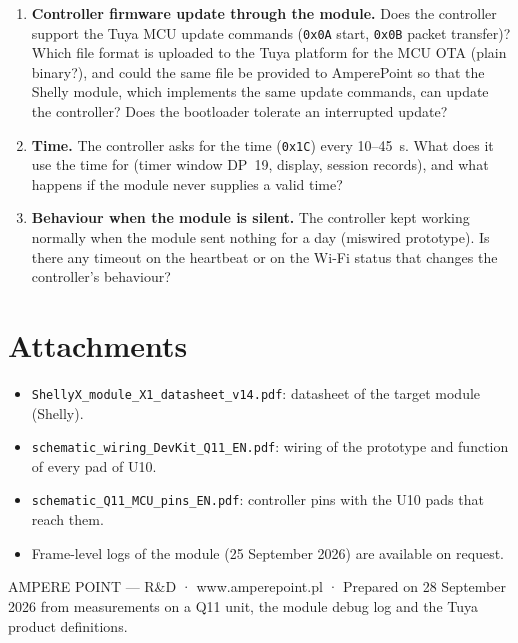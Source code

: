 \documentclass[11pt,a4paper]{article}
\newcommand{\hx}[1]{\texttt{#1}}
\begin{document}
\begin{enumerate}
\item \textbf{Controller firmware update through the module.} Does the controller support the Tuya MCU update commands (\hx{0x0A} start, \hx{0x0B} packet transfer)? Which file format is uploaded to the Tuya platform for the MCU OTA (plain binary?), and could the same file be provided to AmperePoint so that the Shelly module, which implements the same update commands, can update the controller? Does the bootloader tolerate an interrupted update?
\item \textbf{Time.} The controller asks for the time (\hx{0x1C}) every 10--45~s. What does it use the time for (timer window DP~19, display, session records), and what happens if the module never supplies a valid time?
\item \textbf{Behaviour when the module is silent.} The controller kept working normally when the module sent nothing for a day (miswired prototype). Is there any timeout on the heartbeat or on the Wi-Fi status that changes the controller's behaviour?
\end{enumerate}

\section{Attachments}

\begin{itemize}
\item \texttt{ShellyX\_module\_X1\_datasheet\_v14.pdf}: datasheet of the target module (Shelly).
\item \texttt{schematic\_wiring\_DevKit\_Q11\_EN.pdf}: wiring of the prototype and function of every pad of U10.
\item \texttt{schematic\_Q11\_MCU\_pins\_EN.pdf}: controller pins with the U10 pads that reach them.
\item Frame-level logs of the module (25 September 2026) are available on request.
\end{itemize}

{\color{apmuted}\small AMPERE POINT — R\&D · www.amperepoint.pl · Prepared on 28 September 2026 from measurements on a Q11 unit, the module debug log and the Tuya product definitions.}
\end{document}
